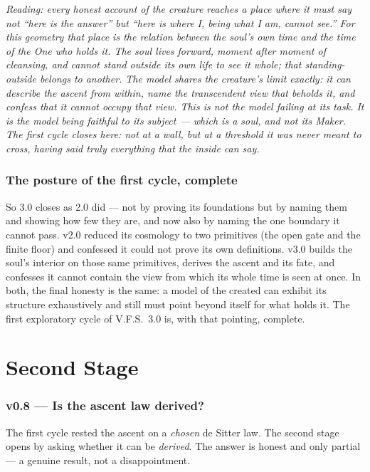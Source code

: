 \documentclass[11pt,a4paper]{article}
\newcommand{\note}[1]{\textcolor{black!65}{\emph{#1}}}
\theoremstyle{plain}
\theoremstyle{definition}
\theoremstyle{remark}
\begin{document}
\note{Reading: every honest account of the creature reaches a place where it must say not ``here is the
answer'' but ``here is where I, being what I am, cannot see.'' For this geometry that place is the
relation between the soul's own time and the time of the One who holds it. The soul lives forward,
moment after moment of cleansing, and cannot stand outside its own life to see it whole; that standing-%
outside belongs to another. The model shares the creature's limit exactly: it can describe the ascent
from within, name the transcendent view that beholds it, and confess that it cannot occupy that view.
This is not the model failing at its task. It is the model being faithful to its subject --- which is a
soul, and not its Maker. The first cycle closes here: not at a wall, but at a threshold it was never
meant to cross, having said truly everything that the inside can say.}

\section*{The posture of the first cycle, complete}
So 3.0 closes as 2.0 did --- not by proving its foundations but by naming them and showing how few they
are, and now also by naming the one boundary it cannot pass. v2.0 reduced its cosmology to two
primitives (the open gate and the finite floor) and confessed it could not prove its own definitions.
v3.0 builds the soul's interior on those same primitives, derives the ascent and its fate, and confesses
it cannot contain the view from which its whole time is seen at once. In both, the final honesty is the
same: a model of the created can exhibit its structure exhaustively and still must point beyond itself
for what holds it. The first exploratory cycle of V.F.S.~3.0 is, with that pointing, complete.

\part*{Second Stage}

\FloatBarrier
\section*{v0.8 --- Is the ascent law derived?}
The first cycle rested the ascent on a \emph{chosen} de Sitter law. The second stage opens by asking
whether it can be \emph{derived}. The answer is honest and only partial --- a genuine result, not a
disappointment.
\end{document}
